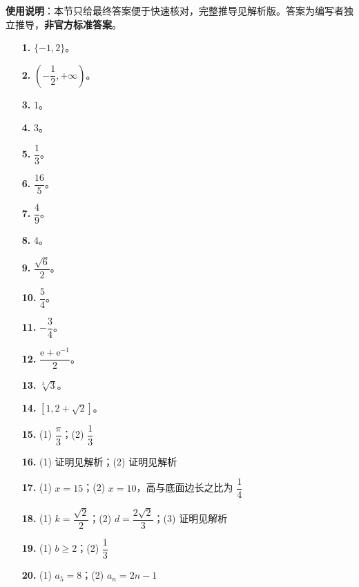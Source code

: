 
\begin{gknotice}
\textbf{使用说明}：本节只给最终答案便于快速核对，完整推导见解析版。答案为编写者独立推导，\textbf{非官方标准答案}。
\end{gknotice}

\begin{itemize}[leftmargin=2.6em]
  \item[\textbf{1.}] $\{-1,2\}$。
  \item[\textbf{2.}] $\left(-\dfrac12,+\infty\right)$。
  \item[\textbf{3.}] $1$。
  \item[\textbf{4.}] $3$。
  \item[\textbf{5.}] $\dfrac13$。
  \item[\textbf{6.}] $\dfrac{16}5$。
  \item[\textbf{7.}] $\dfrac49$。
  \item[\textbf{8.}] $4$。
  \item[\textbf{9.}] $\dfrac{\sqrt6}2$。
  \item[\textbf{10.}] $\dfrac54$。
  \item[\textbf{11.}] $-\dfrac34$。
  \item[\textbf{12.}] $\dfrac{\mathrm e+\mathrm e^{-1}}2$。
  \item[\textbf{13.}] $\sqrt[3]{3}$。
  \item[\textbf{14.}] $[1,2+\sqrt2]$。
\end{itemize}

\begin{itemize}[leftmargin=2.6em]
  \item[\textbf{15.}] (1) $\dfrac\pi3$；(2) $\dfrac13$
  \item[\textbf{16.}] (1) 证明见解析；(2) 证明见解析
  \item[\textbf{17.}] (1) $x=15$；(2) $x=10$，高与底面边长之比为 $\dfrac14$
  \item[\textbf{18.}] (1) $k=\dfrac{\sqrt2}2$；(2) $d=\dfrac{2\sqrt2}3$；(3) 证明见解析
  \item[\textbf{19.}] (1) $b\geqslant2$；(2) $\dfrac13$
  \item[\textbf{20.}] (1) $a_5=8$；(2) $a_n=2n-1$
\end{itemize}

